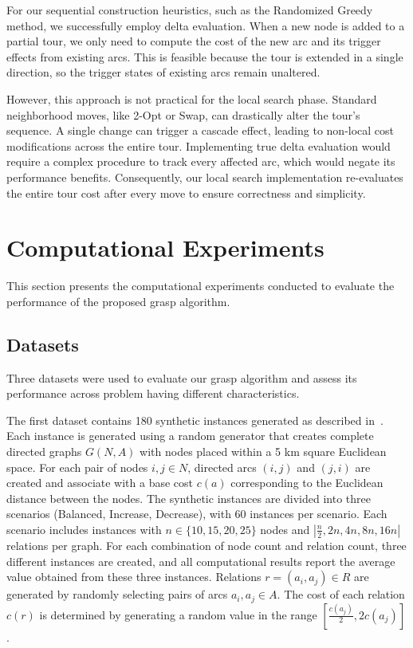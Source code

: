 \documentclass[twocolumn, switch]{article} %
\begin{document}
For our sequential construction heuristics, such as the Randomized Greedy method, we successfully employ delta evaluation. When a new node is added to a partial tour, we only need to compute the cost of the new arc and its trigger effects from existing arcs. This is feasible because the tour is extended in a single direction, so the trigger states of existing arcs remain unaltered.

However, this approach is not practical for the local search phase. Standard neighborhood moves, like 2-Opt or Swap, can drastically alter the tour's sequence. A single change can trigger a cascade effect, leading to non-local cost modifications across the entire tour. Implementing true delta evaluation would require a complex procedure to track every affected arc, which would negate its performance benefits. Consequently, our local search implementation re-evaluates the entire tour cost after every move to ensure correctness and simplicity.

\section{Computational Experiments}
This section presents the computational experiments conducted to evaluate the performance of the proposed \gls{grasp} algorithm.

\subsection{Datasets}

Three datasets were used to evaluate our \gls{grasp} algorithm and assess its performance across problem having different characteristics.

The first dataset contains 180 synthetic instances generated as described in~\citet{Cerrone}.
Each instance is generated using a random generator that creates complete directed graphs $G(N,A)$ 
with nodes placed within a 5 km square Euclidean space. 
For each pair of nodes $i, j \in N$, directed arcs $(i, j)$ and $(j, i)$ are created and associate with a base cost $c(a)$ 
corresponding to the Euclidean distance between the nodes. The synthetic instances are divided into three scenarios 
(Balanced, Increase, Decrease), with 60 instances per scenario. Each scenario includes instances with $n \in \{10, 15, 20, 25\}$ 
nodes and $|\frac{n}{2}, 2n, 4n, 8n, 16n|$ relations per graph. For each combination of node count and relation count, three 
different instances are created, and all computational results report the average value obtained from these three instances.
Relations $r = (a_i, a_j) \in R$ are generated by randomly selecting pairs of arcs $a_i, a_j \in A$. The cost of each relation $c(r)$ 
is determined by generating a random value in the range $[\frac{c(a_j)}{2}, 2c(a_j)]$.
\end{document}
